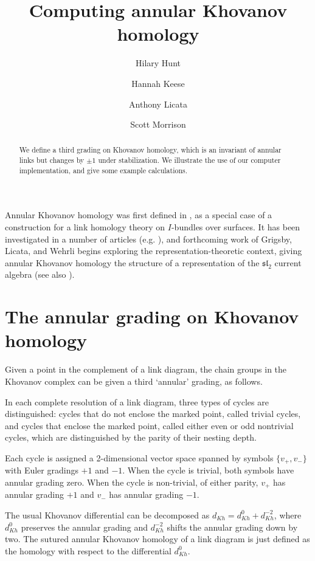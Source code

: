 \documentclass{amsart}
\title{Computing annular Khovanov homology}
\author{Hilary Hunt}
\author{Hannah Keese}
\author{Anthony Licata}
\author{Scott Morrison}
\theoremstyle{plain}
\begin{document}
\begin{abstract}
We define a third grading on Khovanov homology, which is an invariant of annular links but changes by $\pm 1$ under stabilization. We illustrate the use of our computer implementation, and give some example calculations.
\end{abstract}

\maketitle


Annular Khovanov homology was first defined in \cite{MR2113902}, as a special case of a construction for a link homology theory on $I$-bundles over surfaces. It has been investigated in a number of articles (e.g. \cite{MR2728482, MR3147412, MR2866927, 1212.2222, 1303.1986, 1305.2183}), and forthcoming work of Grigsby, Licata, and Wehrli begins exploring the representation-theoretic context, giving annular Khovanov homology the structure of a representation of the $\mathfrak{sl}_2$ current algebra (see also \cite{KeeseThesis}).


\section{The annular grading on Khovanov homology}
Given a point in the complement of a link diagram, the chain groups in the Khovanov complex can be given a third `annular' grading, as follows.

In each complete resolution of a link diagram, three types of cycles are distinguished: cycles that do not enclose the marked point, called trivial cycles, and cycles that enclose the marked point, called either even or odd nontrivial cycles, which are distinguished by the parity of their nesting depth.

Each cycle is assigned a 2-dimensional vector space spanned by symbols $\{v_+, v_-\}$ with Euler gradings $+1$ and $-1$. When the cycle is trivial, both symbols have annular grading zero. When the cycle is non-trivial, of either parity, $v_+$ has annular grading $+1$ and $v_-$ has annular grading $-1$.

The usual Khovanov differential can be decomposed as $d_{Kh}=d_{Kh}^0+d_{Kh}^{-2}$, where $d_{Kh}^0$ preserves the annular grading and $d_{Kh}^{-2}$ shifts the annular grading down by two. The  sutured annular Khovanov homology of a link diagram is just defined as the homology with respect to the differential $d_{Kh}^0$.
\end{document}

